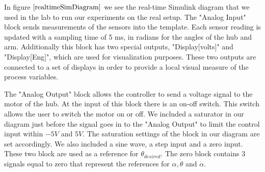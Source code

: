 \documentclass[ twoside,openright,titlepage,numbers=noenddot,headinclude,%
                footinclude=true,cleardoublepage=empty,abstractoff, %
                BCOR=5mm,paper=a4,fontsize=11pt,%
                ngerman,american,%
                ]{scrreprt}
\begin{document}
{In figure $\eqref{realtimeSimDiagram}$ we see the real-time Simulink diagram that we used in the lab to run our experiments on the real setup. The "Analog Input" block sends measurements of the sensors into the template. Each sensor reading is updated with a sampling time of 5 ms, in radians for the angles of the hub and arm. Additionally this block has two special outputs, "Display[volts]" and "Display[Eng]", which are used for visualization purposes. These two outputs are connected to a set of displays in order to provide a local visual measure of the process variables. 

The "Analog Output" block allows the controller to send a voltage signal to the motor of the hub. At the input of this block there is an on-off switch. This switch allows the user to switch the motor on or off. We included a saturator in our diagram just before the signal goes in to the "Analog Output" to limit the control input within $-5V$ and $5V$. The saturation settings of the block in our diagram are set accordingly. We also included a sine wave, a step input and a zero input. These two block are used as a reference for $\theta_{desired}$. The zero block contains 3 signals equal to zero that represent the references for $\alpha, \dot{\theta}$ and $\dot{\alpha}$.


}
\end{document}
